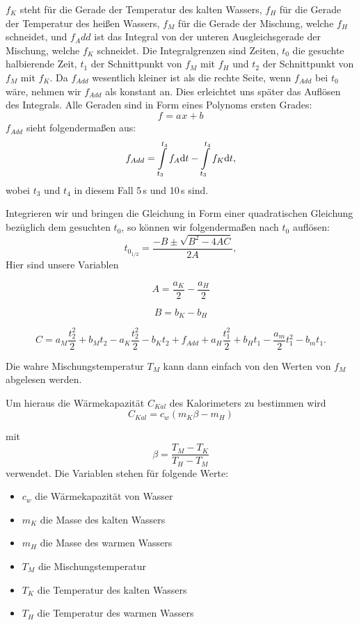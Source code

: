 \documentclass[11pt,a4paper]{article}
\begin{document}
$f_K$ steht f\"ur die Gerade der Temperatur des kalten Wassers, $f_H$ f\"ur die Gerade der Temperatur des hei\ss en Wassers, $f_M$ f\"ur die Gerade der Mischung, welche $f_H$ schneidet, und $f_Add$ ist das Integral von der unteren Ausgleichsgerade der Mischung, welche $f_K$ schneidet. Die Integralgrenzen sind Zeiten, $t_0$ die gesuchte halbierende Zeit, $t_1$ der Schnittpunkt von $f_M$ mit $f_H$ und $t_2$ der Schnittpunkt von $f_M$ mit $f_K$. Da $f_{Add}$ wesentlich kleiner ist als die rechte Seite, wenn $f_{Add}$ bei $t_0$ w\"are, nehmen wir $f_{Add}$ als konstant an. Dies erleichtet uns sp\"ater das Aufl\"osen des Integrals. Alle Geraden sind in Form eines Polynoms ersten Grades:
\begin{equation}
f_{}=a_{}x+b_{}
\end{equation}
$f_{Add}$ sieht folgenderma\ss en aus:
\begin{equation}
f_{Add}=\int\displaylimits_{t_{3}}^{t_4}f_A\mathrm{d}t-\int\displaylimits_{t_{3}}^{t_4}f_K\mathrm{d}t,
\end{equation}
wobei $t_3$ und $t_4$ in diesem Fall 5\,s und 10\,s sind.

Integrieren wir und bringen die Gleichung in Form einer quadratischen Gleichung bez\"uglich dem gesuchten $t_0$, so k\"onnen wir folgenderma\ss en nach $t_0$ aufl\"osen:
\begin{equation}
t_{0_{1/2}}=\frac{-B\pm\sqrt{B^2-4AC}}{2A},\label{abc1}
\end{equation}
Hier sind unsere Variablen

\[
A=\frac{a_K}{2}-\frac{a_H}{2}
\]

\[
B=b_K-b_H
\]

\[
C=a_M\frac{t_2^2}{2}+b_Mt_2-a_K\frac{t_2^2}{2}-b_Kt_2+f_{Add}+a_H\frac{t_1^2}{2}+b_Ht_1-\frac{a_m}{2}t_1^2-b_mt_1.
\]

Die wahre Mischungstemperatur $T_M$ kann dann einfach von den Werten von $f_M$ abgelesen werden.

Um hieraus die W\"armekapazit\"at $C_{Kal}$ des Kalorimeters zu bestimmen wird
\begin{equation}
C_{Kal}=c_w(m_K\beta-m_H)\label{ck1}
\end{equation}

mit 
\[
\beta=\frac{T_M-T_K}{T_H-T_M}
\]
verwendet. Die Variablen stehen f\"ur folgende Werte:
\begin{itemize}
\item{$c_w$ die W\"armekapazit\"at von Wasser}
\item{$m_K$ die Masse des kalten Wassers}
\item{$m_H$ die Masse des warmen Wassers}
\item{$T_M$ die Mischungstemperatur}
\item{$T_K$ die Temperatur des kalten Wassers}
\item{$T_H$ die Temperatur des warmen Wassers}
\end{itemize}
\end{document}
